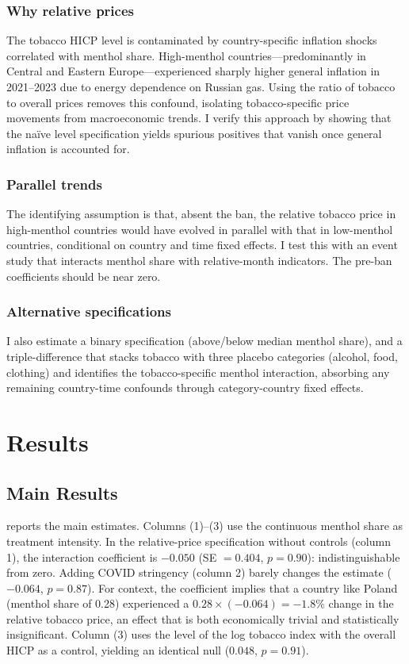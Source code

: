 \documentclass[12pt]{article}
\begin{document}
\subsubsection*{Why relative prices} The tobacco HICP level is contaminated by country-specific inflation shocks correlated with menthol share. High-menthol countries---predominantly in Central and Eastern Europe---experienced sharply higher general inflation in 2021--2023 due to energy dependence on Russian gas. Using the ratio of tobacco to overall prices removes this confound, isolating tobacco-specific price movements from macroeconomic trends. I verify this approach by showing that the na\"ive level specification yields spurious positives that vanish once general inflation is accounted for.

\subsubsection*{Parallel trends} The identifying assumption is that, absent the ban, the relative tobacco price in high-menthol countries would have evolved in parallel with that in low-menthol countries, conditional on country and time fixed effects. I test this with an event study that interacts menthol share with relative-month indicators. The pre-ban coefficients should be near zero.

\subsubsection*{Alternative specifications} I also estimate a binary specification (above/below median menthol share), and a triple-difference that stacks tobacco with three placebo categories (alcohol, food, clothing) and identifies the tobacco-specific menthol interaction, absorbing any remaining country-time confounds through category-country fixed effects.


\section{Results}

\subsection{Main Results}

 reports the main estimates. Columns (1)--(3) use the continuous menthol share as treatment intensity. In the relative-price specification without controls (column 1), the interaction coefficient is $-0.050$ (SE $= 0.404$, $p = 0.90$): indistinguishable from zero. Adding COVID stringency (column 2) barely changes the estimate ($-0.064$, $p = 0.87$). For context, the coefficient implies that a country like Poland (menthol share of 0.28) experienced a $0.28 \times (-0.064) = -1.8$\% change in the relative tobacco price, an effect that is both economically trivial and statistically insignificant. Column (3) uses the level of the log tobacco index with the overall HICP as a control, yielding an identical null ($0.048$, $p = 0.91$).
\end{document}
